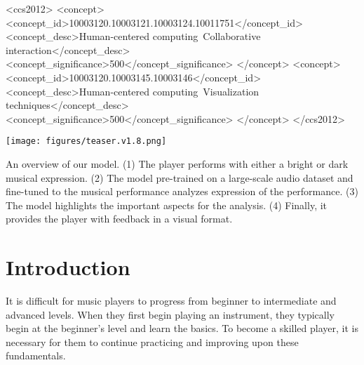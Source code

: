 \documentclass[manuscript,review,anonymous]{acmart}
\begin{document}
\begin{CCSXML}
<ccs2012>
   <concept>
       <concept_id>10003120.10003121.10003124.10011751</concept_id>
       <concept_desc>Human-centered computing~Collaborative interaction</concept_desc>
       <concept_significance>500</concept_significance>
       </concept>
   <concept>
       <concept_id>10003120.10003145.10003146</concept_id>
       <concept_desc>Human-centered computing~Visualization techniques</concept_desc>
       <concept_significance>500</concept_significance>
       </concept>
 </ccs2012>
\end{CCSXML}



\begin{teaserfigure}
    \centering
    \texttt{[image: figures/teaser.v1.8.png]}
    \caption{
        An overview of our model. (1) The player performs with either a bright or dark musical expression. (2) The model pre-trained on a large-scale audio dataset and fine-tuned to the musical performance analyzes expression of the performance. (3) The model highlights the important aspects for the analysis. (4) Finally, it provides the player with feedback in a visual format.
    }
    \label{teaser}
\end{teaserfigure}


\maketitle

\section{Introduction}
It is difficult for music players to progress from beginner to intermediate and advanced levels. 
When they first begin playing an instrument, they typically begin at the beginner's level and learn the basics.
To become a skilled player, it is necessary for them to continue practicing and improving upon these fundamentals.
\end{document}
